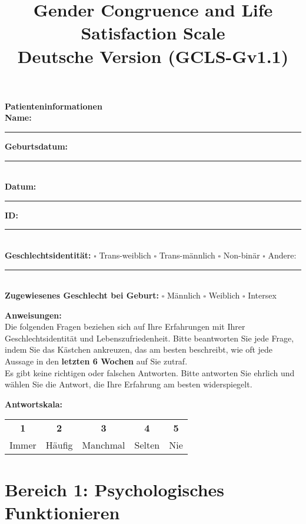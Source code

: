 \documentclass[11pt,a4paper]{article}
\title{
    \vspace{-1cm}
    {\LARGE\bfseries\color{darkblue} Gender Congruence and Life Satisfaction Scale}\\[0.3cm]
    {\Large\bfseries Deutsche Version (GCLS-Gv1.1)}
}
\author{}
\date{}
\newcommand{\responsescale}{
\begin{tcolorbox}[colback=lightgray,colframe=darkblue,width=\textwidth,arc=2mm]
\centering
\textbf{Antwortskala:}\\[0.2cm]
\begin{tabular}{ccccc}
\textbf{1} & \textbf{2} & \textbf{3} & \textbf{4} & \textbf{5} \\
Immer & Häufig & Manchmal & Selten & Nie \\
\end{tabular}
\end{tcolorbox}
}
\begin{document}
\maketitle

\begin{center}
\begin{tcolorbox}[colback=lightblue,colframe=darkblue,width=0.9\textwidth,arc=3mm]
\centering
\textbf{\large Patienteninformationen}\\[0.5cm]
\small
\textbf{Name:} \rule{4cm}{0.4pt} \hspace{1cm} \textbf{Geburtsdatum:} \rule{3cm}{0.4pt}\\[0.3cm]
\textbf{Datum:} \rule{3cm}{0.4pt} \hspace{1cm} \textbf{ID:} \rule{3cm}{0.4pt}\\[0.5cm]
\textbf{Geschlechtsidentität:} $\square$ Trans-weiblich \quad $\square$ Trans-männlich \quad $\square$ Non-binär \quad $\square$ Andere: \rule{3cm}{0.4pt}\\[0.3cm]
\textbf{Zugewiesenes Geschlecht bei Geburt:} $\square$ Männlich \quad $\square$ Weiblich \quad $\square$ Intersex
\end{tcolorbox}
\end{center}

\vspace{1cm}

\begin{tcolorbox}[colback=lightgray,colframe=darkblue,width=\textwidth,arc=2mm]
\textbf{\large Anweisungen:}\\[0.3cm]
Die folgenden Fragen beziehen sich auf Ihre Erfahrungen mit Ihrer Geschlechtsidentität und Lebenszufriedenheit. Bitte beantworten Sie jede Frage, indem Sie das Kästchen ankreuzen, das am besten beschreibt, wie oft jede Aussage in den \textbf{letzten 6 Wochen} auf Sie zutraf.\\[0.3cm]
Es gibt keine richtigen oder falschen Antworten. Bitte antworten Sie ehrlich und wählen Sie die Antwort, die Ihre Erfahrung am besten widerspiegelt.
\end{tcolorbox}

\responsescale

\vspace{0.5cm}

\section*{\color{darkblue}Bereich 1: Psychologisches Funktionieren}
\end{document}
